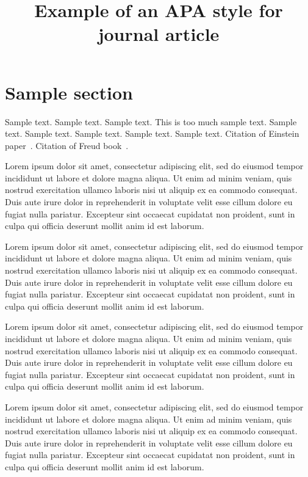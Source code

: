 \documentclass[jou,apacite]{apa6}
\title{Example of an APA style for journal article}
\begin{document}
\maketitle    
                        
\section{Sample section}
Sample text. Sample text. Sample text. This is too much sample text.
Sample text. Sample text. Sample text. 
Sample text. Sample text. Citation of Einstein paper~\cite{Einstein}. Citation of Freud book~\cite{Freud}.

Lorem ipsum dolor sit amet, consectetur adipiscing elit, sed do eiusmod tempor incididunt ut labore et dolore magna aliqua. Ut enim ad minim veniam, quis nostrud exercitation ullamco laboris nisi ut aliquip ex ea commodo consequat. Duis aute irure dolor in reprehenderit in voluptate velit esse cillum dolore eu fugiat nulla pariatur. Excepteur sint occaecat cupidatat non proident, sunt in culpa qui officia deserunt mollit anim id est laborum.

Lorem ipsum dolor sit amet, consectetur adipiscing elit, sed do eiusmod tempor incididunt ut labore et dolore magna aliqua. Ut enim ad minim veniam, quis nostrud exercitation ullamco laboris nisi ut aliquip ex ea commodo consequat. Duis aute irure dolor in reprehenderit in voluptate velit esse cillum dolore eu fugiat nulla pariatur. Excepteur sint occaecat cupidatat non proident, sunt in culpa qui officia deserunt mollit anim id est laborum.

Lorem ipsum dolor sit amet, consectetur adipiscing elit, sed do eiusmod tempor incididunt ut labore et dolore magna aliqua. Ut enim ad minim veniam, quis nostrud exercitation ullamco laboris nisi ut aliquip ex ea commodo consequat. Duis aute irure dolor in reprehenderit in voluptate velit esse cillum dolore eu fugiat nulla pariatur. Excepteur sint occaecat cupidatat non proident, sunt in culpa qui officia deserunt mollit anim id est laborum.

Lorem ipsum dolor sit amet, consectetur adipiscing elit, sed do eiusmod tempor incididunt ut labore et dolore magna aliqua. Ut enim ad minim veniam, quis nostrud exercitation ullamco laboris nisi ut aliquip ex ea commodo consequat. Duis aute irure dolor in reprehenderit in voluptate velit esse cillum dolore eu fugiat nulla pariatur. Excepteur sint occaecat cupidatat non proident, sunt in culpa qui officia deserunt mollit anim id est laborum.
\end{document}
